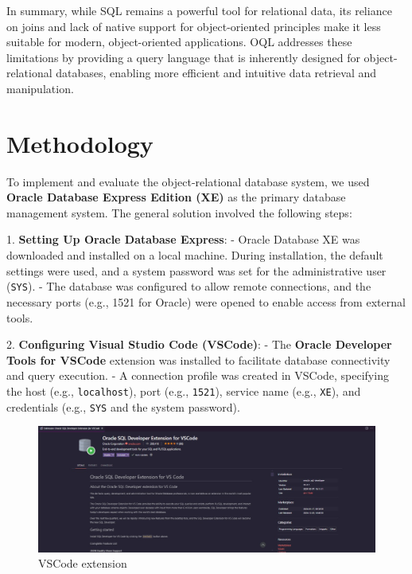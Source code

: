 \documentclass{article}
\begin{document}
In summary, while SQL remains a powerful tool for relational data, its reliance on joins and lack of native support for object-oriented principles make it less suitable for modern, object-oriented applications. OQL addresses these limitations by providing a query language that is inherently designed for object-relational databases, enabling more efficient and intuitive data retrieval and manipulation.

\section{Methodology}
To implement and evaluate the object-relational database system, we used \textbf{Oracle Database Express Edition (XE)} as the primary database management system. The general solution involved the following steps:

1. \textbf{Setting Up Oracle Database Express}:
   - Oracle Database XE was downloaded and installed on a local machine. During installation, the default settings were used, and a system password was set for the administrative user (\texttt{SYS}).
   - The database was configured to allow remote connections, and the necessary ports (e.g., 1521 for Oracle) were opened to enable access from external tools.

2. \textbf{Configuring Visual Studio Code (VSCode)}:
   - The \textbf{Oracle Developer Tools for VSCode} extension was installed to facilitate database connectivity and query execution.
   - A connection profile was created in VSCode, specifying the host (e.g., \texttt{localhost}), port (e.g., \texttt{1521}), service name (e.g., \texttt{XE}), and credentials (e.g., \texttt{SYS} and the system password).

	 \begin{figure}[H]
		 \centering
		 \includegraphics[width=1\textwidth]{imgs/ext.jpeg}
		 \caption{VSCode extension}
		 \label{fig:1}
		\end{figure}
\end{document}
